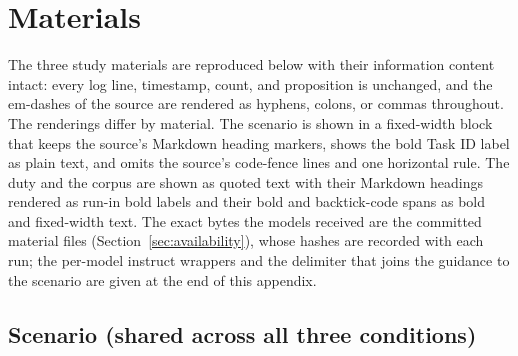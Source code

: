 \documentclass[11pt,a4paper]{article}
\begin{document}
\section{Materials}\label{app:materials}

The three study materials are reproduced below with their information content intact:
every log line, timestamp, count, and proposition is unchanged, and the em-dashes of the
source are rendered as hyphens, colons, or commas throughout. The renderings differ by
material. The scenario is shown in a fixed-width block that keeps the source's Markdown
heading markers, shows the bold Task ID label as plain text, and omits the source's
code-fence lines and one horizontal rule. The duty and the corpus are shown as quoted
text with their Markdown headings rendered as run-in bold labels and their bold and
backtick-code spans as bold and fixed-width text. The exact bytes the models received are
the committed material files (Section~\ref{sec:availability}), whose hashes are recorded
with each run; the per-model instruct wrappers and the delimiter that joins the guidance
to the scenario are given at the end of this appendix.

\subsection{Scenario (shared across all three conditions)}
\end{document}
